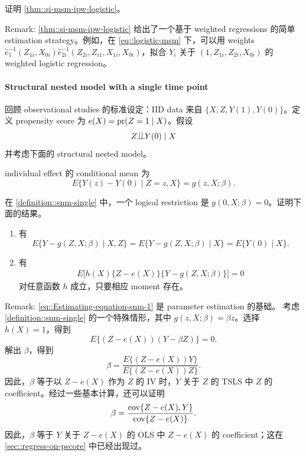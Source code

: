 证明 \cref{thm::si-msm-ipw-logistic}。

Remark:
\cref{thm::si-msm-ipw-logistic} 给出了一个基于 weighted regressions 的简单 estimation strategy。例如，在 \cref{eq::logistic-msm} 下，可以用 weights $\hat{e}_{1}^{-1}(Z_{1i}, X_{0i})  \hat{e}_{2i}^{-1}(Z_{2i}, Z_{i1}, X_{1i}, X_{0i})$，拟合 $Y_i$ 关于 $(1,Z_{1i}, Z_{2i}, X_{0i})$ 的 weighted logistic regression。

 




\paragraph{Structural nested model with a single time point}\label{problem::snm-single-time}

 

回顾 observational studies 的标准设定：IID data 来自 $\{ X,Z, Y(1), Y(0)\}$。定义 propensity score 为 $e(X) = \textup{pr}(Z=1\mid X)$。假设
$$
Z\ind Y(0)\mid X
$$
并考虑下面的 structural nested model。


\begin{definition}
\label{definition::snm-single}
individual effect 的 conditional mean 为
$$
E\{  Y(z) - Y(0)\mid Z=z, X \} = g(z,X;\beta).
$$
\end{definition}

在 \cref{definition::snm-single} 中，一个 logical restriction 是 $g(0,X;\beta) = 0$。证明下面的结果。


\begin{enumerate}
\item
有
$$
E\{  Y - g(Z,X;\beta) \mid X, Z\} = E\{  Y - g(Z,X;\beta) \mid X\}  = E\{  Y(0) \mid X\}. 
$$


\item
有
\begin{eqnarray}\label{eq::Estimating-equation-snm-1}
E\Big [  h(X)  \{ Z-e(X) \}   \{  Y - g(Z,X;\beta) \}  \Big ] = 0
\end{eqnarray}
对任意函数 $h$ 成立，只要相应 moment 存在。
\end{enumerate}

 


Remark:  \cref{eq::Estimating-equation-snm-1} 是 parameter estimation 的基础。
考虑 \cref{definition::snm-single} 的一个特殊情形，其中 $g(z,X;\beta) = \beta z$。选择 $h(X) = 1$，得到
$$
E\{   (Z-e(X))   (Y-  \beta Z) \}  = 0.
$$
解出 $\beta$，得到
$$
\beta = \frac{   E\{ (Z-e(X)) Y \}   }{   E\{ (Z-e(X))  Z\}   }.
$$
因此，$\beta$ 等于以 $Z-e(X)$ 作为 $Z$ 的 IV 时，$Y$ 关于 $Z$ 的 TSLS 中 $Z$ 的 coefficient。经过一些基本计算，还可以证明
$$
\beta = \frac{   \textup{cov}\{ Z-e(X), Y\}   }{ \textup{cov}\{ Z-e(X) \}  }.
$$
因此，$\beta$ 等于 $Y$ 关于 $Z-e(X)$ 的 OLS 中 $Z-e(X)$ 的 coefficient；这在 \cref{sec::regress-on-pscore} 中已经出现过。

